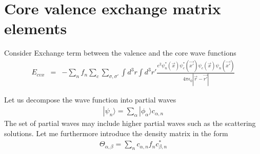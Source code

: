 \documentclass[11pt,a4paper]{report}
\begin{document}
\chapter{Core valence exchange matrix elements}




Consider Exchange term between the valence and the core wave functions
\begin{eqnarray}
E_{cvx}&=&-\sum_nf_n \sum_c 
\sum_{\sigma,\sigma'}\int d^3r\int d^3r'
\frac{e^2
\psi^*_n(\vec{x})\psi^*_c(\vec{x'})
\psi_c(\vec{x})\psi_n(\vec{x'})}{4\pi\epsilon_0|\vec{r}-\vec{r'}|}
\end{eqnarray}

Let us decompose the wave function into partial waves 
\begin{eqnarray}
|\psi_n\rangle=\sum_\alpha |\phi_\alpha\rangle c_{\alpha,n}
\end{eqnarray}
The set of partial waves may include higher partial waves such as the
scattering solutions. Let me furthermore  introduce the density
matrix in the form
\begin{eqnarray}
\Theta_{\alpha,\beta}=\sum_n c_{\alpha,n} f_n c^*_{\beta,n}
\end{eqnarray}
\end{document}
